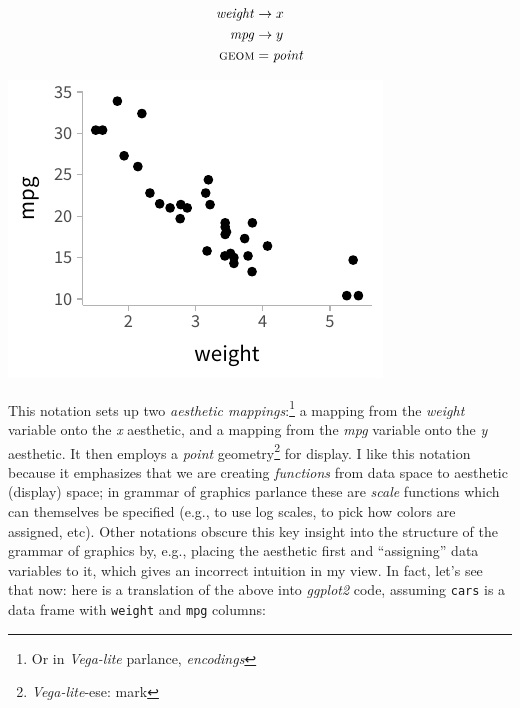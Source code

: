 \documentclass[journal]{vgtc}              %
\begin{document}
\hfill\break
\noindent
  \begin{minipage}{.5\columnwidth}
    \begin{align*}
\mathit{weight} &\rightarrow x\\
\mathit{mpg} &\rightarrow y\\
\textsc{geom} &= \mathit{point}
\end{align*}
  \end{minipage}%
  \begin{minipage}{.4\columnwidth}
    \centering
    \includegraphics[width=1.2\columnwidth]{figs/2-mpg_v_weight.pdf}
  \end{minipage}


This notation sets up two \textit{aesthetic mappings}:\footnote{Or in \textit{Vega-lite} parlance, \textit{encodings}} a mapping from the \textit{weight} variable onto the \textit{x} aesthetic, and a mapping from the \textit{mpg} variable onto the \textit{y} aesthetic. It then employs a \textit{point} geometry\footnote{\textit{Vega-lite}-ese: mark} for display. I like this notation because it emphasizes that we are creating \textit{functions} from data space to aesthetic (display) space; in grammar of graphics parlance these are \textit{scale} functions which can themselves be specified (e.g., to use log scales, to pick how colors are assigned, etc). Other notations obscure this key insight into the structure of the grammar of graphics by, e.g., placing the aesthetic first and ``assigning'' data variables to it, which gives an incorrect intuition in my view. In fact, let's see that now: here is a translation of the above into \textit{ggplot2} code, assuming \texttt{cars} is a data frame with \texttt{weight} and \texttt{mpg} columns:
\end{document}
